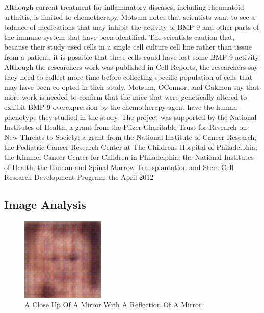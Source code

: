 \documentclass{article}%
\begin{document}
Although current treatment for inflammatory diseases, including rheumatoid arthritis, is limited to chemotherapy, Motsum notes that scientists want to see a balance of medications that may inhibit the activity of BMP{-}9 and other parts of the immune system that have been identified.\newline%
The scientists caution that, because their study used cells in a single cell culture cell line rather than tissue from a patient, it is possible that these cells could have lost some BMP{-}9 activity. Although the researchers work was published in Cell Reports, the researchers say they need to collect more time before collecting specific population of cells that may have been co{-}opted in their study. Motsum, OConnor, and Gakmon say that more work is needed to confirm that the mice that were genetically altered to exhibit BMP{-}9 overexpression by the chemotherapy agent have the human phenotype they studied in the study.\newline%
The project was supported by the National Institutes of Health, a grant from the Pfizer Charitable Trust for Research on New Threats to Society; a grant from the National Institute of Cancer Research; the Pediatric Cancer Research Center at The Childrens Hospital of Philadelphia; the Kimmel Cancer Center for Children in Philadelphia; the National Institutes of Health; the Human and Spinal Marrow Transplantation and Stem Cell Research Development Program; the April 2012

%
\subsection{Image Analysis}%
\label{subsec:ImageAnalysis}%


\begin{figure}[h!]%
\centering%
\includegraphics[width=150px]{500_fake_images/samples_5_467.png}%
\caption{A Close Up Of A Mirror With A Reflection Of A Mirror}%
\end{figure}

%
\end{document}
